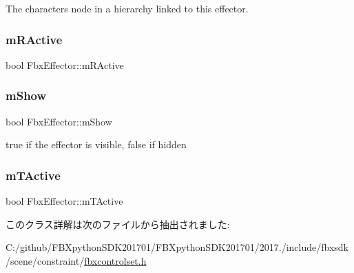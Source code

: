 The character\textquotesingle{}s node in a hierarchy linked to this effector. 

\mbox{\label{class_fbx_effector_a6a37a72600a06dba114a47d6c98731c7}} 
\subsubsection{\texorpdfstring{m\+R\+Active}{mRActive}}
{\footnotesize\ttfamily bool Fbx\+Effector\+::m\+R\+Active}

\mbox{\label{class_fbx_effector_aea6c24780611a7878ed22d9358715e25}} 
\subsubsection{\texorpdfstring{m\+Show}{mShow}}
{\footnotesize\ttfamily bool Fbx\+Effector\+::m\+Show}



{\ttfamily true} if the effector is visible, {\ttfamily false} if hidden 

\mbox{\label{class_fbx_effector_ab4cb3feccf5586307ec12f9c208d256b}} 
\subsubsection{\texorpdfstring{m\+T\+Active}{mTActive}}
{\footnotesize\ttfamily bool Fbx\+Effector\+::m\+T\+Active}



このクラス詳解は次のファイルから抽出されました\+:\begin{DoxyCompactItemize}
\item 
C\+:/github/\+F\+B\+Xpython\+S\+D\+K201701/\+F\+B\+Xpython\+S\+D\+K201701/2017./include/fbxsdk/scene/constraint/\hyperlink{fbxcontrolset_8h}{fbxcontrolset.\+h}\end{DoxyCompactItemize}
